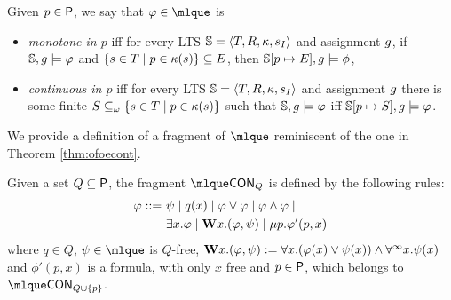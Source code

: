%
%
\begin{definition}
Given $p \in \mathsf{P}$, we say that $\varphi \in \mlque$ is
\begin{itemize}
\item \emph{monotone in $p$} iff for every LTS $\mathbb{S}=\langle{T,R,\kappa, s_I}\rangle$ and assignment $g$, if $\mathbb{S}, g \models \varphi$ and $ \{s \in T \mid p\in \kappa(s)\} \subseteq E$, then $\mathbb{S}[p \mapsto E], g\models \phi$,

\item %
    \emph{continuous in $p$} iff for every LTS $\mathbb{S}=\langle{T,R,\kappa, s_I}\rangle$ and assignment $g$ there is some finite $S \subseteq_\omega \{s \in T \mid p\in \kappa(s)\}$ such that $\mathbb{S}, g \models \varphi$ iff $\mathbb{S}[p \mapsto S], g \models \varphi$.
\end{itemize}
\end{definition}

We provide a definition of a fragment of $\mlque$ reminiscent of the one in
Theorem \ref{thm:ofoecont}.
\begin{definition}
Given a set $Q\subseteq \mathsf{P}$, the fragment $\cont{\mlque}{Q}$ is defined by the following rules:
\begin{align*}
\varphi ::=\ & \psi \mid q(x) \mid \varphi \lor \varphi \mid \varphi \land \varphi \mid\\
& \exists x.\varphi \mid \mathbf{W} x.(\varphi,\psi) \mid \mu p.\varphi'(p,x)
\end{align*}
%
where $q \in Q$,
$\psi \in \mlque$ is $Q$-free,
$\mathbf{W} x.(\varphi,\psi)
:= \forall x.(\varphi(x) \lor \psi(x)) \land \forall^\infty x.\psi(x)$ and $\phi'(p,x)$
is a formula, with only $x$ free and $p \in \mathsf{P}$, which belongs to
$\cont{\mlque}{Q \cup\{p\}}$.
\end{definition}

